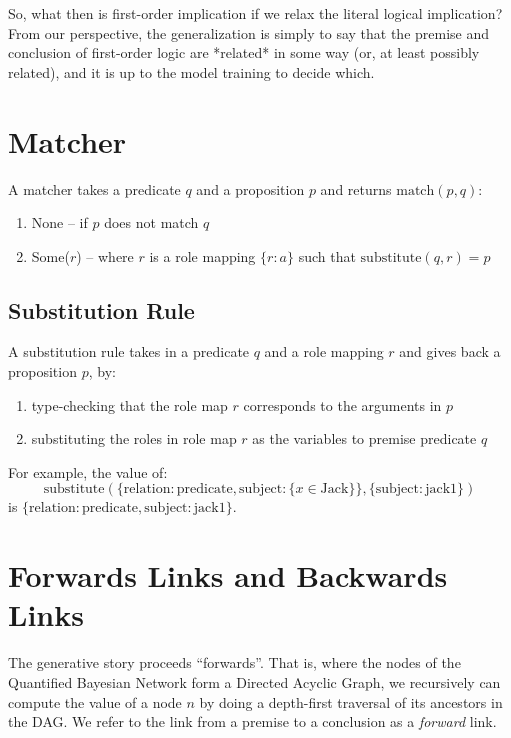 \documentclass[12pt]{article}
\begin{document}
So, what then is first-order implication if we relax the literal logical implication?
From our perspective, the generalization is simply to say that the premise and conclusion of first-order logic are *related* in some way (or, at least possibly related), and it is up to the model training to decide which.

\section{Matcher}
A matcher takes a predicate \( q \) and a proposition \( p \) and returns \( \text{match}(p, q) \):
\begin{enumerate}
    \item None -- if \( p \) does not match \( q \)
    \item Some(\( r \)) -- where \( r \) is a role mapping \( \{r: a\} \) such that \( \text{substitute}(q, r) = p \)
\end{enumerate}

\subsection*{Substitution Rule}
A substitution rule takes in a predicate \( q \) and a role mapping \( r \) and gives back a proposition \( p \), by:
\begin{enumerate}
    \item type-checking that the role map \( r \) corresponds to the arguments in \( p \)
    \item substituting the roles in role map \( r \) as the variables to premise predicate \( q \)
\end{enumerate}

For example, the value of:
\[ \text{substitute}(\{\text{relation}: \text{predicate}, \text{subject}:\{x \in \text{Jack}\}\}, \{\text{subject}:\text{jack1}\}) \]
is \( \{\text{relation}: \text{predicate}, \text{subject}:\text{jack1}\} \).



\section{Forwards Links and Backwards Links}
The generative story proceeds ``forwards''.
That is, where the nodes of the Quantified Bayesian Network form a Directed Acyclic Graph, we recursively can compute the value of a node \( n \) by doing a depth-first traversal of its ancestors in the DAG.
We refer to the link from a premise to a conclusion as a \emph{forward} link.
\end{document}
